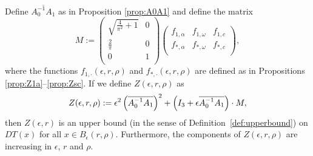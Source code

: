 \begin{theorem}
	\label{prop:Zdef}
	Define $\overline{A_0^{-1} A_1}$ as in Proposition \ref{prop:A0A1} and define the matrix 
	\begin{equation}\label{e:defM}
	M := 
	\left(
	\begin{array}{cc}
	\sqrt{\tfrac{4}{\pi^2}+1} & 0 \\
	\frac{2}{\pi } & 0 \\
	0 & 1 \\
	\end{array}
	\right)
	\left(
	\begin{array}{ccc}
	f_{1,\alpha } & f_{1,\omega } & f_{1,c} \\
	f_{*,\alpha } & f_{*,\omega } & f_{*,c} \\
	\end{array}
	\right) ,
	\end{equation}
	where the functions $f_{1,\cdot}(\epsilon,r,\rho)$ and $f_{*,\cdot}(\epsilon,r,\rho)$ are defined as in Propositions \ref{prop:Z1a}--\ref{prop:Zsc}. 
	If we define $Z(\epsilon,r,\rho)$ as 
	\begin{equation}
		Z(\epsilon,r,\rho) := \epsilon^2  \left(\overline{ A_0^{-1} A_1 }\right)^2  + 
		\left(I_3 + \epsilon \overline{ A_0^{-1} A_1 } \right) \cdot M ,
	\end{equation}
	then $Z(\epsilon,r)$ is an upper bound (in the sense of Definition~\ref{def:upperbound}) on $DT(x)$ for all $ x \in B_\epsilon(r , \rho)$. 
	Furthermore, the components of $Z(\epsilon,r,\rho)$ are increasing in  $ \epsilon$, $r$ and $\rho$. 
\end{theorem}

